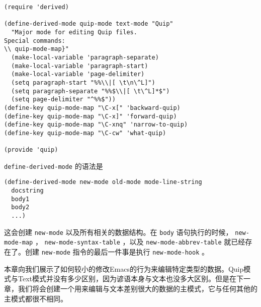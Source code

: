 \begin{verbatim}
(require 'derived)

(define-derived-mode quip-mode text-mode "Quip"
  "Major mode for editing Quip files.
Special commands:
\\ quip-mode-map}"
  (make-local-variable 'paragraph-separate)
  (make-local-variable 'paragraph-start)
  (make-local-variable 'page-delimiter)
  (setq paragraph-start "%%\\|[ \t\n\^L]")
  (setq paragraph-separate "%%$\\|[ \t\^L]*$")
  (setq page-delimiter "^%%$"))
(define-key quip-mode-map "\C-x[" 'backward-quip)
(define-key quip-mode-map "\C-x]" 'forward-quip)
(define-key quip-mode-map "\C-xnq" 'narrow-to-quip)
(define-key quip-mode-map "\C-cw" 'what-quip)

(provide 'quip)
\end{verbatim}

\texttt{define-derived-mode} 的语法是

\begin{verbatim}
(define-derived-mode new-mode old-mode mode-line-string
  docstring
  body1
  body2
  ...)
\end{verbatim}

这会创建 \texttt{new-mode} 以及所有相关的数据结构。在 \texttt{body} 语句执行的时候， \texttt{new-mode-map} ， \texttt{new-mode-syntax-table} ，以及 \texttt{new-mode-abbrev-table} 就已经存在了。创建 \texttt{new-mode} 指令的最后一件事是执行 \texttt{new-mode-hook} 。

本章向我们展示了如何较小的修改Emacs的行为来编辑特定类型的数据。Quip模式与Text模式并没有多少区别，因为谚语本身与文本也没多大区别。但是在下一章，我们将会创建一个用来编辑与文本差别很大的数据的主模式，它与任何其他的主模式都很不相同。
